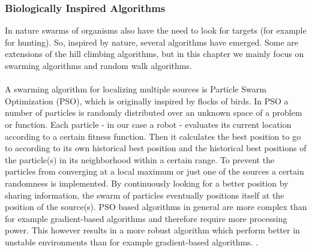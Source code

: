 	\subsubsection{Biologically Inspired Algorithms}
		\label{subsubsec:BiologicallyInspired}
		In nature swarms of organisms also have the need to look for targets (for example for hunting). 
		So, inspired by nature, several algorithms have emerged. 
		Some are extensions of the hill climbing algorithms, but in this chapter we mainly focus on swarming algorithms and random walk algorithms.\\
		\\
		A swarming algorithm for localizing multiple sources is Particle Swarm Optimization (PSO), which is originally inspired by flocks of birds.
		In PSO a number of particles is randomly distributed over an unknown space of a problem or function. 
		Each particle - in our case a robot - evaluates its current location according to a certain fitness function.
		Then it calculates the best position to go to according to its own historical best position and the historical best positions of the particle(s) in its neighborhood within a certain range.
		To prevent the particles from converging at a local maximum or just one of the sources a certain randomness is implemented. 
		By continuously looking for a better position by sharing information, the swarm of particles eventually positions itself at the position of the source(s). \cite{poli2007particle} 
		PSO based algorithms in general are more complex than for example gradient-based algorithms and therefore require more processing power.
		This however results in a more robust algorithm which perform better in unstable environments than for example gradient-based algorithms. \cite{marques2006particle}.
